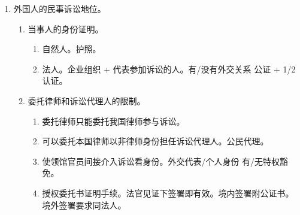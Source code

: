 \begin{enumerate}
  \item 外国人的民事诉讼地位。
        \begin{enumerate}
          \item 当事人的身份证明。
                \begin{enumerate}
                  \item 自然人。护照。
                  \item 法人。企业组织 + 代表参加诉讼的人。有/没有外交关系  公证 + 1/2 认证。
                \end{enumerate}
          \item 委托律师和诉讼代理人的限制。
                \begin{enumerate}
                  \item 委托律师只能委托我国律师参与诉讼。
                  \item 可以委托本国律师以非律师身份担任诉讼代理人。\bdy 公民代理。
                  \item 使领馆官员间接介入诉讼看身份。外交代表/个人身份 \yjt 有/无特权豁免。
                  \item 授权委托书证明手续。\yi 法官见证下签署即有效。\er 境内签署附公证书。\er 境外签署要求同法人。
                \end{enumerate}
        \end{enumerate}
\end{enumerate}
